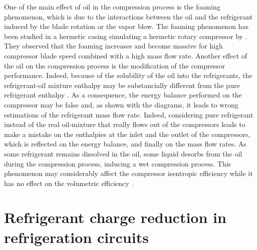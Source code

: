 One of the main effect of oil in the compression process is the
foaming phenomenon, which is due to the interactions between the oil
and the refrigerant induced by the blade rotation or the vapor
blow. The foaming phenomenon has been studied in a hermetic casing
simulating a hermetic rotary compressor by
\citet{Yanagisawa-Fukuta-1991a}. They observed that the foaming
increases and become massive for high compressor blade speed combined
with a high mass flow rate. Another effect of the oil on the
compression process is the modification of the compressor
performance. Indeed, because of the solubility of the oil into the
refrigerants, the refrigerant-oil mixture
enthalpy may be substancially different from the pure refrigerant
enthalpy \citep[Fig.\,2--4,
p.\,288--289]{YoubiIdrissi-Meunier-2003a}. As a consequence, the
energy balance performed on the compressor may be false and, as shown
with the \citet[Fig.\,2--4, p.\,288--289]{YoubiIdrissi-Meunier-2003a}
diagrams, it leads to wrong estimations of the refrigerant mass flow
rate. Indeed, considering pure refrigerant instead of the real
oil-mixture that really flows out of the compressors leads to make a
mistake on the enthalpies at the inlet and the outlet of the
compressors, which is reflected on the energy balance, and finally on
the mass flow rates. As some refrigerant remains dissolved in the oil,
some liquid desorbs from the oil during the compression process,
inducing a wet compression process. This phenomenon may considerably
affect the compressor isentropic efficiency while it has no effect on
the volumetric efficiency \citep{Wang-Dickson-2006a}.


\section{Refrigerant charge reduction in
  refrigeration circuits}

